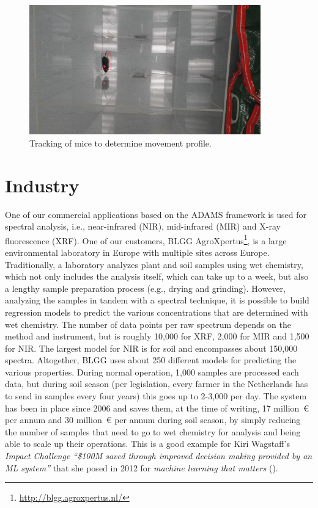 \documentclass[wcp]{jmlr}
\begin{document}
\begin{figure}[htb]
  \centering
  \includegraphics[width=10.0cm]{images/object_tracking_mouse.png}
  \caption{Tracking of mice to determine movement profile.}
  \label{object_tracking_mouse}
\end{figure}


\section{Industry}
One of our commercial applications based on the ADAMS framework is used for spectral analysis, i.e., near-infrared (NIR), mid-infrared (MIR) and X-ray fluorescence (XRF). One of our customers, BLGG AgroXpertus\footnote{\url{http://blgg.agroxpertus.nl/}{}}, is a large environmental laboratory in Europe with multiple sites across Europe. Traditionally, a laboratory analyzes plant and soil samples using wet chemistry, which not only includes the analysis itself, which can take up to a week, but also a lengthy sample preparation process (e.g., drying and grinding). However, analyzing the samples in tandem with a spectral technique, it is possible to build regression models to predict the various concentrations that are determined with wet chemistry. The number of data points per raw spectrum depends on the method and instrument, but is roughly 10,000 for XRF, 2,000 for MIR and 1,500 for NIR. The largest model for NIR is for soil and encompasses about 150,000 spectra. Altogether, BLGG uses about 250 different models for predicting the various properties. During normal operation, 1,000 samples are processed each data, but during soil season (per legislation, every farmer in the Netherlands has to send in samples every four years) this goes up to 2-3,000 per day. The system has been in place since 2006 and saves them, at the time of writing, 17 million~\euro{} per annum and 30 million~\euro{} per annum during soil season, by simply reducing the number of samples that need to go to wet chemistry for analysis and being able to scale up their operations. This is a good example for Kiri Wagstaff's \textit{Impact Challenge ``\$100M saved through improved decision making provided by an ML system''} that she posed in 2012 for \textit{machine learning that matters} (\cite{wagstaff}).
\end{document}
